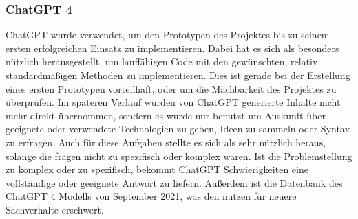 \subsubsection{ChatGPT 4}
ChatGPT wurde verwendet, um den Prototypen des Projektes bis zu seinem ersten erfolgreichen Einsatz zu implementieren. Dabei hat es sich als besonders nützlich herausgestellt, um lauffähigen Code mit den gewünschten, relativ standardmäßigen Methoden zu implementieren. Dies ist gerade bei der Erstellung eines ersten Prototypen vorteilhaft, oder um die Machbarkeit des Projektes zu überprüfen. Im späteren Verlauf wurden von ChatGPT generierte Inhalte nicht mehr direkt übernommen, sondern es wurde nur benutzt um Auskunft über geeignete oder verwendete Technologien zu geben, Ideen zu sammeln oder Syntax zu erfragen. Auch für diese Aufgaben stellte es sich als sehr nützlich heraus, solange die fragen nicht zu spezifisch oder komplex waren. Ist die Problemstellung zu komplex oder zu spezifisch, bekommt ChatGPT Schwierigkeiten eine vollständige oder geeignete Antwort zu liefern. Außerdem ist die Datenbank des ChatGPT 4 Modells von September 2021, was den nutzen für neuere Sachverhalte erschwert.